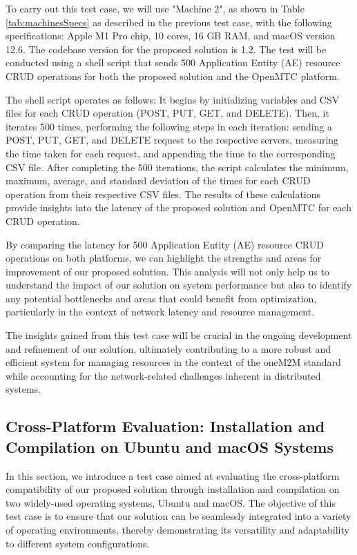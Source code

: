 \documentclass[a4paper,fleqn]{cas-dc}
\begin{document}
To carry out this test case, we will use "Machine 2", as shown in Table \ref{tab:machinesSpecs} as described in the previous test case, with the following specifications: Apple M1 Pro chip, 10 cores, 16 GB RAM, and macOS version 12.6. The codebase version for the proposed solution is 1.2. The test will be conducted using a shell script that sends 500 Application Entity (AE) resource CRUD operations for both the proposed solution and the OpenMTC platform.

The shell script operates as follows: It begins by initializing variables and CSV files for each CRUD operation (POST, PUT, GET, and DELETE). Then, it iterates 500 times, performing the following steps in each iteration: sending a POST, PUT, GET, and DELETE request to the respective servers, measuring the time taken for each request, and appending the time to the corresponding CSV file. After completing the 500 iterations, the script calculates the minimum, maximum, average, and standard deviation of the times for each CRUD operation from their respective CSV files. The results of these calculations provide insights into the latency of the proposed solution and OpenMTC for each CRUD operation.

By comparing the latency for 500 Application Entity (AE) resource CRUD operations on both platforms, we can highlight the strengths and areas for improvement of our proposed solution. This analysis will not only help us to understand the impact of our solution on system performance but also to identify any potential bottlenecks and areas that could benefit from optimization, particularly in the context of network latency and resource management.

The insights gained from this test case will be crucial in the ongoing development and refinement of our solution, ultimately contributing to a more robust and efficient system for managing resources in the context of the oneM2M standard while accounting for the network-related challenges inherent in distributed systems.

\subsection{Cross-Platform Evaluation: Installation and Compilation on Ubuntu and macOS Systems}

In this section, we introduce a test case aimed at evaluating the cross-platform compatibility of our proposed solution through installation and compilation on two widely-used operating systems, Ubuntu and macOS. The objective of this test case is to ensure that our solution can be seamlessly integrated into a variety of operating environments, thereby demonstrating its versatility and adaptability to different system configurations.
\end{document}
